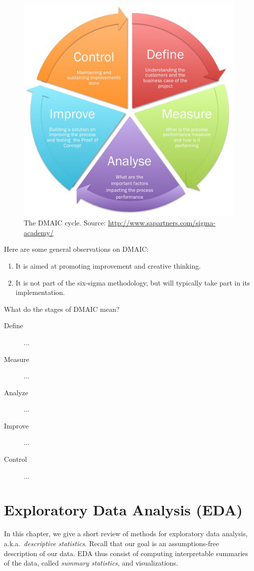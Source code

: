 \documentclass[12pt,a4paper]{report}
\begin{document}
\begin{figure}[t]
\centering
\includegraphics[width=0.6\linewidth]{art/Sigma_detail}
\caption[DMAIC]{The DMAIC cycle. Source: \url{http://www.sapartners.com/sigma-academy/}}
\label{fig:DMAIC}
\end{figure}

Here are some general observations on DMAIC:
\begin{enumerate}
\item It is aimed at promoting improvement and creative thinking.
\item It is not part of the six-sigma methodology, but will typically take part in its implementation.
\end{enumerate}

What do the stages of DMAIC mean?
\begin{description}
\item [Define] ...
\item [Measure] ...
\item [Analyze]...
\item [Improve] ...
\item [Control] ...
\end{description}



\chapter{Exploratory Data Analysis (EDA)}
In this chapter, we give a short review of methods for exploratory data analysis, a.k.a.\ \emph{descriptive statistics}.
Recall that our goal is an assumptions-free description of our data. 
EDA thus consist of computing interpretable summaries of the data, called \emph{summary statistics}, and visualizations. 
\end{document}

